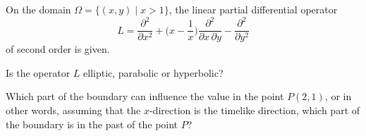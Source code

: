 On the domain $\Omega = \{(x,y)\mid x > 1\}$, the linear partial
differential operator
\begin{equation}
L
=
\frac{\partial^2}{\partial x^2}
+
\biggl(x-\frac1x\biggr)\frac{\partial^2}{\partial x\,\partial y}
-
\frac{\partial^2}{\partial y^2}
\label{90000033:operator}
\end{equation}
of second order is given.
\begin{teilaufgaben}
\item
Is the operator $L$ elliptic, parabolic or hyperbolic?
\item
Which part of the boundary can influence the value in the point
$P(2,1)$, or in other words, assuming that the $x$-direction is the
timelike direction, which part of the boundary is in the past
of the point $P$?
\end{teilaufgaben}

